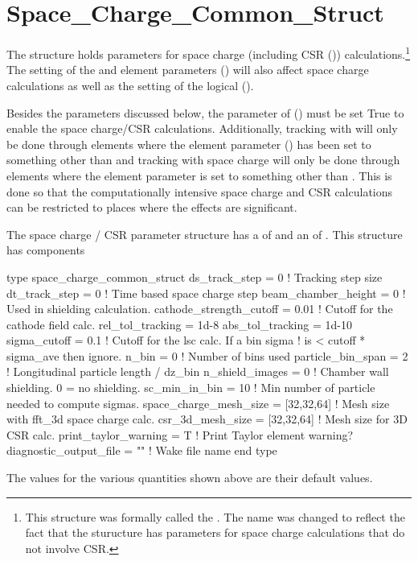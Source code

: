 {%
\section{Space_Charge_Common_Struct}
\label{s:sc.com}

The  structure holds parameters for space charge (including CSR
()) calculations.\footnote
  {
This structure was formally called the . The name was changed to reflect
the fact that the sturucture has parameters for space charge calculations that do not involve CSR.
  }
The setting of the  and  element parameters
() will also affect space charge calculations as well as the setting of the
 logical  ().

Besides the parameters discussed below, the  parameter of 
() must be set True to enable the space charge/CSR calculations. Additionally,
tracking with  will only be done through elements where the element parameter
 () has been set to something other than  and tracking with
space charge will only be done through elements where the element parameter 
is set to something other than . This is done so that the computationally intensive space
charge and CSR calculations can be restricted to places where the effects are significant.

The space charge / CSR parameter structure has a  of 
and an  of . This structure has components
\begin{example}
  type space_charge_common_struct 
    ds_track_step = 0                   ! Tracking step size
    dt_track_step = 0                   ! Time based space charge step
    beam_chamber_height = 0             ! Used in shielding calculation.
    cathode_strength_cutoff = 0.01      ! Cutoff for the cathode field calc.
    rel_tol_tracking = 1d-8
    abs_tol_tracking = 1d-10            
    sigma_cutoff = 0.1                  ! Cutoff for the lsc calc. If a bin sigma
                                        !  is < cutoff * sigma_ave then ignore.
    n_bin = 0                           ! Number of bins used
    particle_bin_span = 2               ! Longitudinal particle length / dz_bin
    n_shield_images = 0                 ! Chamber wall shielding. 0 = no shielding.
    sc_min_in_bin = 10                  ! Min number of particle needed to compute sigmas.
    space_charge_mesh_size = [32,32,64] ! Mesh size with fft_3d space charge calc.
    csr_3d_mesh_size = [32,32,64]       ! Mesh size for 3D CSR calc.
    print_taylor_warning = T            ! Print Taylor element warning?
    diagnostic_output_file = ""         ! Wake file name
  end type
\end{example}
The values for the various quantities shown above are their default values. 

}
